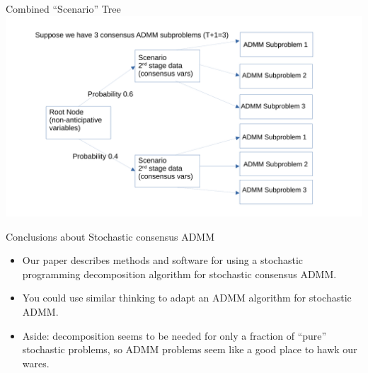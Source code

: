 \documentclass[9pt,usenames,dvipsnames]{beamer}
\begin{document}
\begin{frame}{Combined ``Scenario'' Tree}
\centering
 \includegraphics[width=1.1\linewidth]{tree2.pdf}
\end{frame}

\begin{frame}{Conclusions about Stochastic consensus ADMM}
\begin{itemize}
\item Our paper describes methods and software for using a stochastic programming decomposition algorithm for stochastic consensus ADMM.
\item You could use similar thinking to adapt an ADMM algorithm for stochastic ADMM.
\item Aside: decomposition seems to be needed for only a fraction of ``pure'' stochastic problems, so ADMM problems seem like a good place to hawk our wares.
\end{itemize}
\end{frame}
\end{document}
